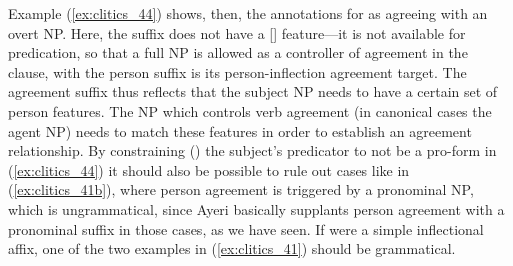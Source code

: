 Example (\ref{ex:clitics_44}) shows, then, the annotations for
 as agreeing with an overt NP. Here, the suffix does
not have a [\Pred{}] feature---it is not available for predication, so that a
full NP is allowed as a controller of agreement in the clause, with the person
suffix is its person-inflection agreement target. The agreement suffix
 thus reflects that the subject NP needs to have a certain set of
person features. The NP which controls verb agreement (in canonical cases the
agent NP) needs to match these features in order to establish an agreement
relationship. By constraining (\req{}) the subject's predicator to not be a
pro-form in (\ref{ex:clitics_44}) it should also be possible to rule out cases
like in (\ref{ex:clitics_41b}), where person agreement is triggered by a
pronominal NP, which is ungrammatical, since Ayeri basically supplants person
agreement with a pronominal suffix in those cases, as we have seen. If
 were a simple inflectional affix, one of the two examples 
in (\ref{ex:clitics_41}) should be grammatical.

\ex\label{ex:clitics_44}
\xe

